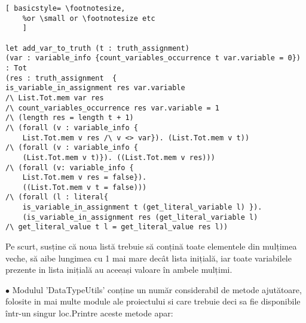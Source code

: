\begin{lstlisting}[	basicstyle= \footnotesize, 
	%or \small or \footnotesize etc
	]

let add_var_to_truth (t : truth_assignment) 
(var : variable_info {count_variables_occurrence t var.variable = 0}) 
: Tot 
(res : truth_assignment  {
is_variable_in_assignment res var.variable
/\ List.Tot.mem var res
/\ count_variables_occurrence res var.variable = 1
/\ (length res = length t + 1) 
/\ (forall (v : variable_info {
	List.Tot.mem v res /\ v <> var}). (List.Tot.mem v t))
/\ (forall (v : variable_info {
	(List.Tot.mem v t)}). ((List.Tot.mem v res)))
/\ (forall (v: variable_info {
	List.Tot.mem v res = false}). 
	((List.Tot.mem v t = false)))
/\ (forall (l : literal{ 
	is_variable_in_assignment t (get_literal_variable l) }). 
	(is_variable_in_assignment res (get_literal_variable l)
/\ get_literal_value t l = get_literal_value res l))  

\end{lstlisting}

 Pe scurt, susține că noua listă trebuie să conțină toate elementele din mulțimea veche, să aibe lungimea cu 1 mai mare decât lista inițială, iar toate variabilele prezente in lista inițială au aceeași valoare în ambele mulțimi.

$\bullet$ Modulul 'DataTypeUtils' conține un număr considerabil de metode ajutătoare, folosite in mai multe module ale proiectului si care trebuie deci sa fie disponibile într-un singur loc.\newpage Printre aceste metode apar:



